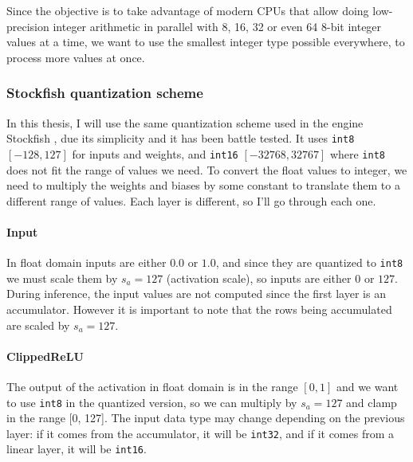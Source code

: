 Since the objective is to take advantage of modern CPUs that allow doing low-precision integer arithmetic in parallel with 8, 16, 32 or even 64 8-bit integer values at a time, we want to use the smallest integer type possible everywhere, to process more values at once.

\subsubsection{Stockfish quantization scheme}

\def\int#1{\texttt{int#1}}

In this thesis, I will use the same quantization scheme used in the engine Stockfish \cite{nnue-pytorch}, due its simplicity and it has been battle tested. It uses \int{8} $[-128, 127]$ for inputs and weights, and \int{16} $[-32768, 32767]$ where \int{8} does not fit the range of values we need.
To convert the float values to integer, we need to multiply the weights and biases by some constant to translate them to a different range of values. Each layer is different, so I'll go through each one.


\paragraph[short]{Input} In float domain inputs are either $0.0$ or $1.0$, and since they are quantized to \int{8} we must scale them by $s_a=127$ (activation scale), so inputs are either $0$ or $127$. During inference, the input values are not computed since the first layer is an accumulator. However it is important to note that the rows being accumulated are scaled by $s_a=127$.

\paragraph[short]{ClippedReLU} The output of the activation in float domain is in the range $[0, 1]$ and we want to use \int{8} in the quantized version, so we can multiply by $s_a=127$ and clamp in the range [0, 127]. The input data type may change depending on the previous layer: if it comes from the accumulator, it will be \int{32}, and if it comes from a linear layer, it will be \int{16}.

